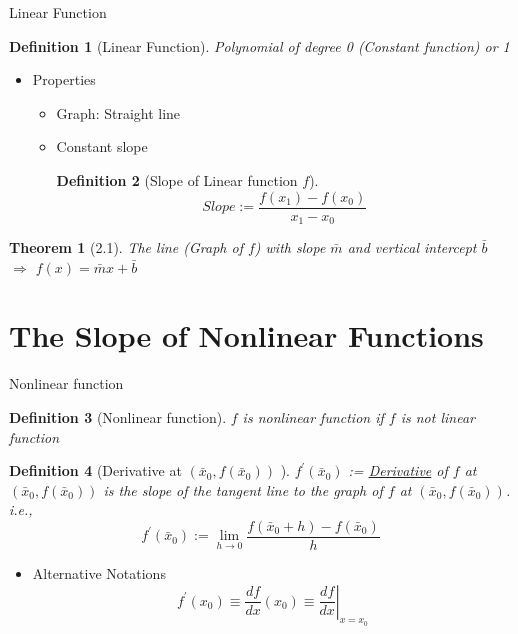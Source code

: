 \documentclass[final]{beamer}
\newtheorem{defn}{Definition}
\newtheorem{thm}{Theorem}
\begin{document}
\begin{frame}[t]{Linear Function}
	\begin{defn}
		[Linear Function]
		Polynomial of degree 0 (Constant function) or 1
	\end{defn}
	\begin{itemize}
		\item Properties
		\begin{itemize}
			\item Graph: Straight line
			\item Constant slope 
			\begin{defn}
				[Slope of Linear function $f$]
				\[
					Slope:= \frac{f(x_1)-f(x_0)}{x_1-x_0}
				\]
			\end{defn}
		\end{itemize}
	\end{itemize}
	\begin{thm}
		[2.1]
		The line (Graph of $f$) with slope $\bar m$ and vertical intercept $\bar b$ $\Rightarrow$ $f(x)=\bar m x + \bar b$
	\end{thm}
\end{frame}

\section{The Slope of Nonlinear Functions} %
\label{sec:the_slope_of_nonlinear_functions}

\begin{frame}[t]{Nonlinear function}
	\begin{defn}
		[Nonlinear function]
		$f$ is nonlinear function if $f$ is not linear function
	\end{defn}
	
	\begin{defn}
		[Derivative at $(\bar x_0, f(\bar x_0))$ ]
		$f^\prime(\bar x_0)$ := \uline{Derivative} of $f$ at $(\bar x_0, f(\bar x_0))$ is the slope of the tangent line to the graph of $f$ at $(\bar x_0, f(\bar x_0))$. \textit{i.e.,}
		\[
			f^\prime(\bar x_0):= \lim_{h\rightarrow 0}\frac{f(\bar x_0+h)-f(\bar x_0)}{h}
		\]
	\end{defn}
	\begin{itemize}
		\item Alternative Notations
		\[
			f^\prime(x_0) \equiv \frac{df}{dx}(x_0) \equiv \left.\frac{df}{dx}\right\vert_{x=x_0}
		\]
	\end{itemize}
\end{frame}
\end{document}
